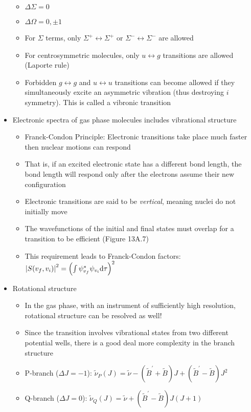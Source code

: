 \documentclass[12pt, openany, letterpaper]{memoir}
\begin{document}
\begin{itemize}
\begin{itemize}
		\item $\Delta \Sigma = 0$
		\item $\Delta \Omega = 0,\pm1$
		\item For $\Sigma$ terms, only $\Sigma^+\leftrightarrow\Sigma^+$ or $\Sigma^-\leftrightarrow\Sigma^-$ are allowed
		\item For centrosymmetric molecules, only $u\leftrightarrow g$ transitions are allowed (Laporte rule)
		\item Forbidden $g\leftrightarrow g$ and $u\leftrightarrow u$ transitions can become allowed if they simultaneously excite an asymmetric vibration (thus destroying $i$ symmetry). This is called a vibronic transition
	\end{itemize}
	\item Electronic spectra of gas phase molecules includes vibrational structure
	\begin{itemize}
		\item Franck-Condon Principle: Electronic transitions take place much faster then nuclear motions can respond
		\item That is, if an excited electronic state has a different bond length, the bond length will respond only after the electrons assume their new configuration
		\item Electronic transitions are said to be \emph{vertical}, meaning nuclei do not initially move
		\item The wavefunctions of the initial and final states must overlap for a transition to be efficient (Figure 13A.7)
		\item This requirement leads to Franck-Condon factors: $\left| S(v_f,v_i) \right|^2 = \left(\int\psi_{v_f}^*\psi_{v_i}\mathrm{d}\tau\right)^2$
	\end{itemize}
	\item Rotational structure
	\begin{itemize}
		\item In the gas phase, with an instrument of sufficiently high resolution, rotational structure can be resolved as well!
		\item Since the transition involves vibrational states from two different potential wells, there is a good deal more complexity in the branch structure
		\item P-branch ($\Delta J = -1$): $\tilde{\nu}_P(J) = \tilde{\nu}-\left(\tilde{B}^\prime + \tilde{B}\right)J + \left(\tilde{B}^\prime - \tilde{B}\right)J^2$
		\item Q-branch ($\Delta J = 0$): $\tilde{\nu}_Q(J) = \tilde{\nu} + \left(\tilde{B}^\prime - \tilde{B}\right)J(J+1)$

\end{itemize}
\end{itemize}
\end{document}
